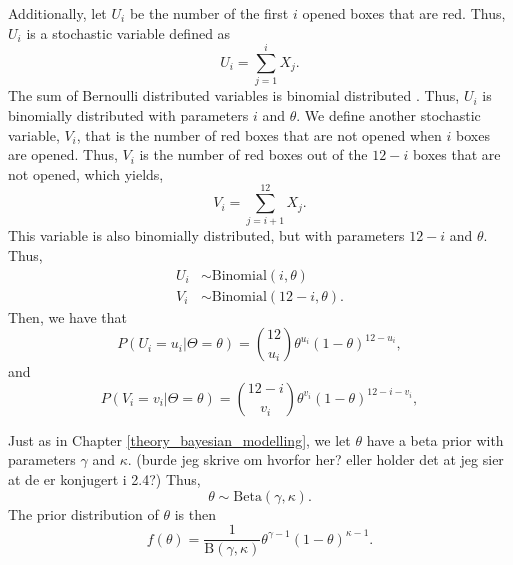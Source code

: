 Additionally, let $U_i$ be the number of the first $i$ opened boxes that are red. Thus, $U_i$ is a stochastic variable defined as
\begin{equation*}
    U_i = \sum_{j=1}^{i} X_j. 
\end{equation*}
The sum of Bernoulli distributed variables is binomial distributed \citep{statinf}. Thus, $U_i$ is binomially distributed with parameters $i$ and $\theta$. We define another stochastic variable, $V_i$, that is the number of red boxes that are not opened when $i$ boxes are opened. Thus, $V_i$ is the number of red boxes out of the $12-i$ boxes that are not opened, which yields,
\begin{equation*}
    V_i = \sum_{j=i+1}^{12} X_j.
\end{equation*}
This variable is also binomially distributed, but with parameters $12-i$ and $\theta$. Thus,
\begin{equation}
\label{U_V_binomal_distri}
    \begin{aligned}
        U_i &\sim \text{Binomial}(i,\theta)\\
        V_i &\sim \text{Binomial}(12-i,\theta).
    \end{aligned}
\end{equation}
Then, we have that 
\begin{equation}
\label{ui_prob_mass}
    P(U_i=u_i|\Theta=\theta) = \binom{12}{u_i} \theta^{u_i}(1-\theta)^{12-u_i},
\end{equation}
and
\begin{equation}
\label{vi_prob_mass}
    P(V_i=v_i|\Theta=\theta) = \binom{12-i}{v_i} \theta^{v_i}(1-\theta)^{12-i-v_i},
\end{equation}

Just as in Chapter \ref{theory_bayesian_modelling}, we let $\theta$ have a beta prior with parameters $\gamma$ and $\kappa$. (burde jeg skrive om hvorfor her? eller holder det at jeg sier at de er konjugert i 2.4?)
Thus, 
\begin{equation}
\label{beta_prior_theta}
    \theta \sim \text{Beta}(\gamma,\kappa).
\end{equation}
The prior distribution of $\theta$ is then
\begin{equation}
\label{beta_density_func}
    f(\theta) = \frac{1}{\text{B}(\gamma,\kappa)}\theta^{\gamma-1}(1-\theta)^{\kappa-1}.
\end{equation}


